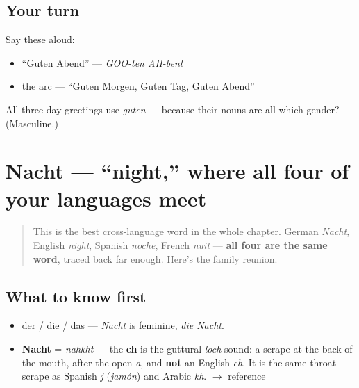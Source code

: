 \subsection*{Your turn}
Say these aloud:

\begin{itemize}
\raggedright
  \item \textquotedblleft{}Guten Abend\textquotedblright{} — \emph{GOO-ten AH-bent}
  \item the arc — \textquotedblleft{}Guten Morgen, Guten Tag, Guten Abend\textquotedblright{}
\end{itemize}

\begin{tcolorbox}[breakable,colback=teal!4,colframe=teal!35!black,title={Before you move on}]
All three day-greetings use \emph{guten} — because their nouns are all which gender? (Masculine.)
\end{tcolorbox}
\section[Nacht]{Nacht — \textquotedblleft{}night,\textquotedblright{} where all four of your languages meet}

\label{lesson:GE-C01-nacht}



\begin{quote}
This is the best cross-language word in the whole chapter. German \emph{Nacht}, English \emph{night}, Spanish \emph{noche}, French \emph{nuit} — \textbf{all four are the same word}, traced back far enough. Here's the family reunion.
\end{quote}

\subsection*{What to know first}
\begin{itemize}
\raggedright
  \item der / die / das — \emph{Nacht} is feminine, \emph{die Nacht}.
\end{itemize}

\begin{sounds}
\begin{itemize}
\raggedright
  \item \textbf{Nacht} = \emph{nahkht} — the \textbf{ch} is the guttural \emph{loch} sound: a scrape at the back of the mouth, after the open \emph{a}, and \textbf{not} an English \emph{ch}. It is the same throat-scrape as Spanish \emph{j} (\emph{jamón}) and Arabic \emph{kh}. $\to$ reference
\end{itemize}
\end{sounds}

